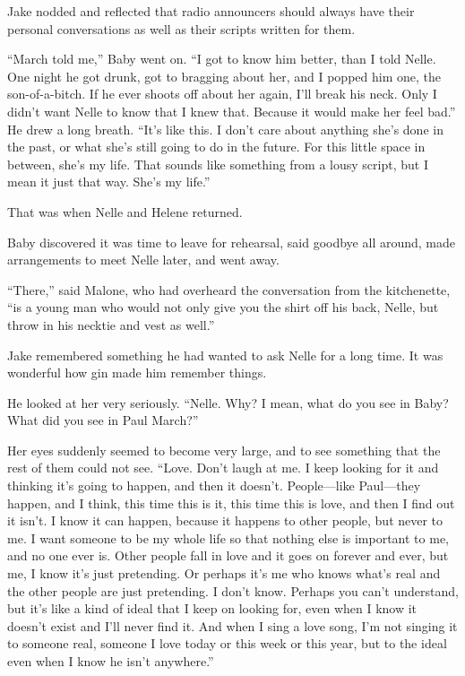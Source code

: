 \documentclass{novel}
\begin{document}
Jake nodded and reflected that radio announcers should always have their personal conversations as well as their scripts written for them.

“March told me,” Baby went on. “I got to know him better, than I told Nelle. One night he got drunk, got to bragging about her, and I popped him one, the son-of-a-bitch. If he ever shoots off about her again, I'll break his neck. Only I didn’t want Nelle to know that I knew that. Because it would make her feel bad.” He drew a long breath. “It’s like this. I don’t care about anything she’s done in the past, or what she’s still going to do in the future. For this little space in between, she’s my life. That sounds like something from a lousy script, but I mean it just that way. She’s my life.”

That was when Nelle and Helene returned.

Baby discovered it was time to leave for rehearsal, said goodbye all around, made arrangements to meet Nelle later, and went away.

“There,” said Malone, who had overheard the conversation from the kitchenette, “is a young man who would not only give you the shirt off his back, Nelle, but throw in his necktie and vest as well.”

Jake remembered something he had wanted to ask Nelle for a long time. It was wonderful how gin made him remember things.

He looked at her very seriously. “Nelle. Why? I mean, what do you see in Baby? What did you see in Paul March?”

Her eyes suddenly seemed to become very large, and to see something that the rest of them could not see. “Love. Don’t laugh at me. I keep looking for it and thinking it’s going to happen, and then it doesn’t. People—like Paul—they happen, and I think, this time this is it, this time this is love, and then I find out it isn’t. I know it can happen, because it happens to other people, but never to me. I want someone to be my whole life so that nothing else is important to me, and no one ever is. Other people fall in love and it goes on forever and ever, but me, I know it’s just pretending. Or perhaps it’s me who knows what’s real and the other people are just pretending. I don’t know. Perhaps you can’t understand, but it’s like a kind of ideal that I keep on looking for, even when I know it doesn’t exist and I’ll never find it. And when I sing a love song, I’m not singing it to someone real, someone I love today or this week or this year, but to the ideal even when I know he isn’t anywhere.”
\end{document}
